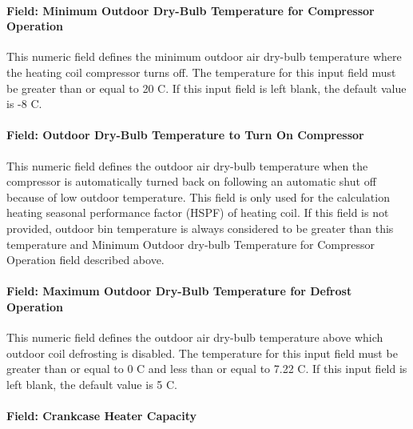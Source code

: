 \paragraph{Field: Minimum Outdoor Dry-Bulb Temperature for Compressor Operation}\label{field-minimum-outdoor-dry-bulb-temperature-for-compressor-operation}

This numeric field defines the minimum outdoor air dry-bulb temperature where the heating coil compressor turns off. The temperature for this input field must be greater than or equal to 20 C. If this input field is left blank, the default value is -8 C.

\paragraph{Field: Outdoor Dry-Bulb Temperature to Turn On Compressor}\label{field-outdoor-dry-bulb-temperature-to-turn-on-compressor}

This numeric field defines the outdoor air dry-bulb temperature when the compressor is automatically turned back on following an automatic shut off because of low outdoor temperature. This field is only used for the calculation heating seasonal performance factor (HSPF) of heating coil. If this field is not provided, outdoor bin temperature is always considered to be greater than this temperature and Minimum Outdoor dry-bulb Temperature for Compressor Operation field described above.

\paragraph{Field: Maximum Outdoor Dry-Bulb Temperature for Defrost Operation}\label{field-maximum-outdoor-dry-bulb-temperature-for-defrost-operation}

This numeric field defines the outdoor air dry-bulb temperature above which outdoor coil defrosting is disabled. The temperature for this input field must be greater than or equal to 0 C and less than or equal to 7.22 C. If this input field is left blank, the default value is 5 C.

\paragraph{Field: Crankcase Heater Capacity}\label{field-crankcase-heater-capacity-4}

